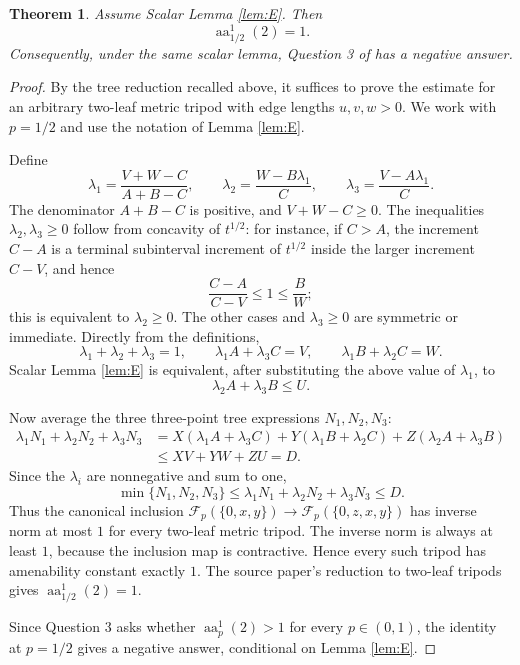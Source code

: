 \documentclass[11pt]{article}
\newtheorem{theorem}{Theorem}
\newcommand{\absamen}{\operatorname{aa}}
\newcommand{\Fp}{\mathcal F_p}
\begin{document}
\begin{theorem}\label{thm:conditional}
Assume Scalar Lemma \ref{lem:E}.  Then
\[
  \absamen_{1/2}^{1}(2)=1.
\]
Consequently, under the same scalar lemma, Question 3 of \cite{CR} has a
negative answer.
\end{theorem}

\begin{proof}
By the tree reduction recalled above, it suffices to prove the estimate for
an arbitrary two-leaf metric tripod with edge lengths \(u,v,w>0\).  We work
with \(p=1/2\) and use the notation of Lemma \ref{lem:E}.

Define
\[
  \lambda_1=\frac{V+W-C}{A+B-C},\qquad
  \lambda_2=\frac{W-B\lambda_1}{C},\qquad
  \lambda_3=\frac{V-A\lambda_1}{C}.
\]
The denominator \(A+B-C\) is positive, and \(V+W-C\ge0\).  The inequalities
\(\lambda_2,\lambda_3\ge0\) follow from concavity of \(t^{1/2}\): for instance,
if \(C>A\), the increment \(C-A\) is a terminal subinterval increment of
\(t^{1/2}\) inside the larger increment \(C-V\), and hence
\[
  \frac{C-A}{C-V}\le1\le\frac{B}{W};
\]
this is equivalent to \(\lambda_2\ge0\).  The other cases and \(\lambda_3\ge0\)
are symmetric or immediate.  Directly from the definitions,
\[
  \lambda_1+\lambda_2+\lambda_3=1,\qquad
  \lambda_1 A+\lambda_3 C=V,\qquad
  \lambda_1 B+\lambda_2 C=W.
\]
Scalar Lemma \ref{lem:E} is equivalent, after substituting the above value of
\(\lambda_1\), to
\[
  \lambda_2 A+\lambda_3 B\le U.
\]

Now average the three three-point tree expressions \(N_1,N_2,N_3\):
\[
\begin{aligned}
\lambda_1N_1+\lambda_2N_2+\lambda_3N_3
&=X(\lambda_1A+\lambda_3C)
  +Y(\lambda_1B+\lambda_2C)
  +Z(\lambda_2A+\lambda_3B)\\
&\le XV+YW+ZU=D.
\end{aligned}
\]
Since the \(\lambda_i\) are nonnegative and sum to one,
\[
  \min\{N_1,N_2,N_3\}\le
  \lambda_1N_1+\lambda_2N_2+\lambda_3N_3\le D.
\]
Thus the canonical inclusion \(\Fp(\{0,x,y\})\to
\Fp(\{0,z,x,y\})\) has inverse norm at most \(1\) for every two-leaf metric
tripod.  The inverse norm is always at least \(1\), because the inclusion map
is contractive.  Hence every such tripod has amenability constant exactly
\(1\).  The source paper's reduction to two-leaf tripods gives
\(\absamen_{1/2}^{1}(2)=1\).

Since Question 3 asks whether \(\absamen_p^1(2)>1\) for every \(p\in(0,1)\), the
identity at \(p=1/2\) gives a negative answer, conditional on Lemma
\ref{lem:E}.
\end{proof}
\end{document}
